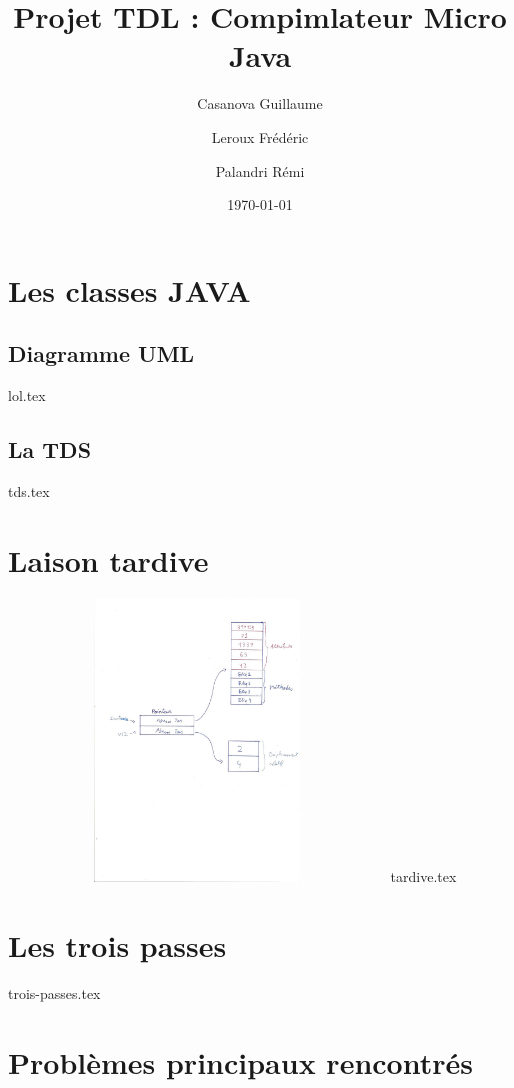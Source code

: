 \documentclass[12pt]{article}
\title{Projet TDL : Compimlateur Micro Java}
\author{ Casanova Guillaume \\
	\and 
	 Leroux Frédéric \\
	\and
	 Palandri Rémi
	}
\date{\today}
\begin{document}
\maketitle

\begin{abstract}

\end{abstract}

\newpage
\setcounter{tocdepth}{1} \tableofcontents

\newpage

\section{Les classes JAVA}
	
	\subsection{Diagramme UML}
		{lol.tex}

	\subsection{La TDS}
		
		{tds.tex}
\newpage
\section{Laison tardive}
		\includegraphics[width=10cm,height=75mm]{img/scan.jpeg}
		{tardive.tex}
\newpage
\section{Les trois passes}
		{trois-passes.tex}	
\newpage
\section{Problèmes principaux rencontrés}
\end{document}
